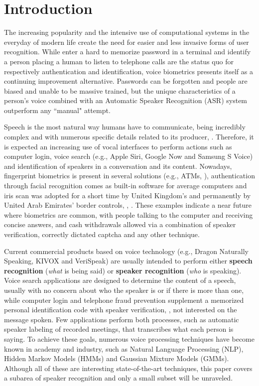 \chapter{Introduction}
\label{ch:intro}

The increasing popularity and the intensive use of computational systems in the everyday of modern life create the need for easier and less invasive forms of user recognition. While enter a hard to memorize password in a terminal and identify a person placing a human to listen to telephone calls are the status quo for respectively authentication and identification, voice biometrics presents itself as a continuing improvement alternative. Passwords can be forgotten and people are biased and unable to be massive trained, but the unique characteristics of a person's voice combined with an Automatic Speaker Recognition (ASR) system outperform any ``manual" attempt.

Speech is the most natural way humans have to communicate, being incredibly complex and with numerous specific details related to its producer, . Therefore, it is expected an increasing use of vocal interfaces to perform actions such as computer login, voice search (e.g., Apple Siri, Google Now and Samsung S Voice) and identification of speakers in a conversation and its content. Nowadays, fingerprint biometrics is present in several solutions (e.g., ATMs, ), authentication through facial recognition comes as built-in software for average computers and iris scan was adopted for a short time by United Kingdom's and permanently by United Arab Emirates' border controls, , . These examples indicate a near future where biometrics are common, with people talking to the computer and receiving concise answers, and cash withdrawals allowed via a combination of speaker verification, correctly dictated captcha and any other technique.

Current commercial products based on voice technology (e.g., Dragon Naturally Speaking, KIVOX and VeriSpeak) are usually intended to perform either \textbf{speech recognition} (\emph{what} is being said) or \textbf{speaker recognition} (\emph{who} is speaking). Voice search applications are designed to determine the content of a speech, usually with no concern about who the speaker is or if there is more than one, while computer login and telephone fraud prevention supplement a memorized personal identification code with speaker verification, , not interested on the message spoken. Few applications perform both processes, such as automatic speaker labeling of recorded meetings, that transcribes what each person is saying. To achieve these goals, numerous voice processing techniques have become known in academy and industry, such as Natural Language Processing (NLP), Hidden Markov Models (HMMs) and Gaussian Mixture Models (GMMs). Although all of these are interesting state-of-the-art techniques, this paper covers a subarea of speaker recognition and only a small subset will be unraveled.

